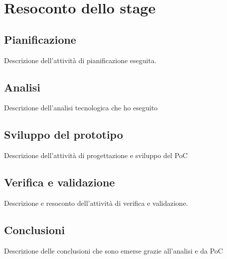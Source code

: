 
\chapter{Resoconto dello stage}
\label{cap:resoconto-stage}

\section{Pianificazione}
Descrizione dell'attività di pianificazione eseguita.

\section{Analisi}

Descrizione dell'analisi tecnologica che ho eseguito

\section{Sviluppo del prototipo}

Descrizione dell'attività di progettazione e sviluppo del PoC

\section{Verifica e validazione}
Descrizione e resoconto dell'attività di verifica e validazione.

\section{Conclusioni}

Descrizione delle conclusioni che sono emerse grazie all'analisi e da PoC

